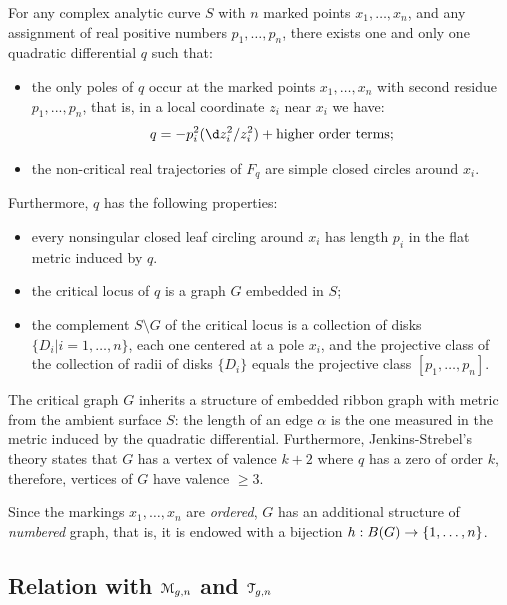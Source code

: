 \begin{theorem} 
  \label{thm:JS}
  For any complex analytic curve $S$ with $n$ marked points $x_1, \ldots,
  x_n$, and any assignment of real positive numbers $p_1, \ldots, p_n$,
  there exists one and only one quadratic differential $q$ such that:
  \begin{itemize}
  \item the only poles of $q$ occur at the marked points $x_1, \ldots, x_n$
    with second residue $p_1, ..., p_n$, that is, in a local
    coordinate $z_i$ near $x_i$ we have:
    \begin{equation*}
      q = -p_i^2 (\d z_i^2 / z_i^2) + \text{higher order terms};
    \end{equation*}
  \item the non-critical real trajectories of $F_q$ are simple closed
    circles around $x_i$.
  \end{itemize}
  Furthermore, $q$ has the following properties:
  \begin{itemize}
  \item every nonsingular closed leaf circling around $x_i$ has length
    $p_i$ in the flat metric induced by $q$.
  \item the critical locus of $q$ is a graph $G$ embedded in $S$;
  \item the complement $S \setminus G$ of the critical locus is a collection
    of disks $\{D_i | i=1,\ldots,n\}$, each one centered at a pole $x_i$, and
    the projective class of the collection of radii of disks $\{D_i\}$
    equals the projective class $[p_1, \ldots, p_n]$.
  \end{itemize}
\end{theorem}
The critical graph $G$ inherits a structure of embedded ribbon graph
with metric from the ambient surface $S$: the length of an edge $\alpha$ is
the one measured in the metric induced by the quadratic differential.
Furthermore, Jenkins-Strebel's theory states that $G$ has a vertex of
valence $k+2$ where $q$ has a zero of order $k$, therefore, vertices
of $G$ have valence $\geq3$. 

Since the markings $x_1, \ldots, x_n$ are \emph{ordered}, $G$ has an
additional structure of \emph{numbered} graph, that is, it is endowed
with a bijection $h: B(G) \to \{1, \ldots, n\}$.


\subsection{Relation with $\mathcal{M}_{g,n}$ and $\mathcal{T}_{g,n}$}
\label{sec:nocomb}

